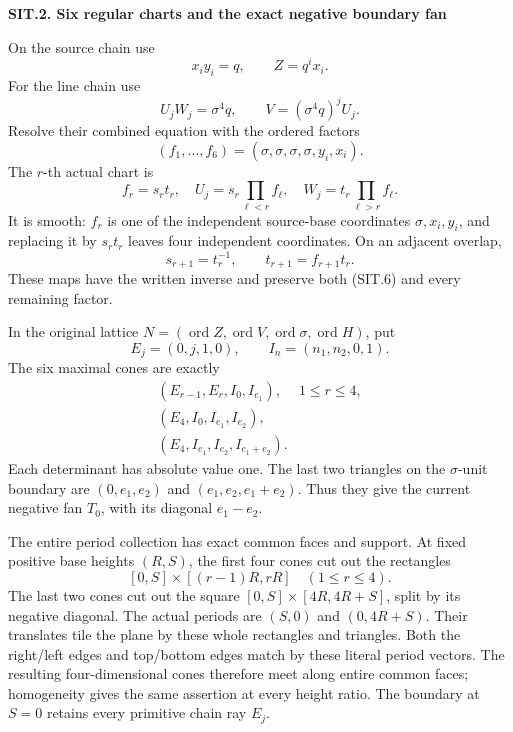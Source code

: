 \par

\medskip\noindent\textbf{SIT.2. Six regular charts and the exact negative boundary fan}

\par\nobreak

On the source chain use
\[
 x_i y_i=q,\qquad Z=q^i x_i.
\]
For the line chain use
\[
 U_j W_j=\sigma^4q,\qquad V=(\sigma^4q)^j U_j.
 \tag{SIT.6}
\]
Resolve their combined equation with the ordered factors
\[
 (f_1,\ldots,f_6)=(\sigma,\sigma,\sigma,\sigma,y_i,x_i).
 \tag{SIT.7}
\]
The \(r\)-th actual chart is
\[
 f_r=s_rt_r,\quad
 U_j=s_r\prod_{\ell<r}f_\ell,\quad
 W_j=t_r\prod_{\ell>r}f_\ell .
 \tag{SIT.8}
\]
It is smooth: \(f_r\) is one of the independent source-base
coordinates \(\sigma,x_i,y_i\), and replacing it by \(s_rt_r\)
leaves four independent coordinates. On an adjacent overlap,
\[
 s_{r+1}=t_r^{-1},\qquad t_{r+1}=f_{r+1}t_r .
 \tag{SIT.9}
\]
These maps have the written inverse and preserve both (SIT.6)
and every remaining factor.

In the original lattice
\(N=(\operatorname{ord}Z,\operatorname{ord}V,
\operatorname{ord}\sigma,\operatorname{ord}H)\), put
\[
 E_j=(0,j,1,0),\qquad I_n=(n_1,n_2,0,1).
\]
The six maximal cones are exactly
\[
 \begin{array}{ll}
 (E_{r-1},E_r,I_0,I_{e_1}),&1\le r\le4,\\
 (E_4,I_0,I_{e_1},I_{e_2}),&\\
 (E_4,I_{e_1},I_{e_2},I_{e_1+e_2}).&
 \end{array}
 \tag{SIT.10}
\]
Each determinant has absolute value one. The last two triangles
on the \(\sigma\)-unit boundary are
\((0,e_1,e_2)\) and \((e_1,e_2,e_1+e_2)\). Thus they give the
current negative fan \(T_0\), with its diagonal \(e_1-e_2\).

The entire period collection has exact common faces and support.
At fixed positive base heights \((R,S)\), the first four cones
cut out the rectangles
\[
 [0,S]\times[(r-1)R,rR]\quad(1\le r\le4).
\]
The last two cones cut out the square
\([0,S]\times[4R,4R+S]\), split by its negative diagonal.
The actual periods are \((S,0)\) and \((0,4R+S)\). Their
translates tile the plane by these whole rectangles and triangles.
Both the right/left edges and top/bottom edges match by these
literal period vectors. The resulting four-dimensional cones
therefore meet along entire common faces; homogeneity gives
the same assertion at every height ratio. The boundary at
\(S=0\) retains every primitive chain ray \(E_j\).

